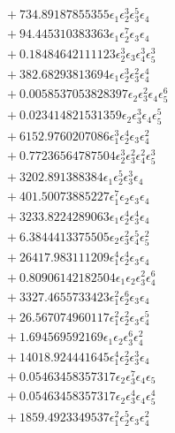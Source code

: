 \documentclass[10pt]{article}
\begin{document}
\begin{align*}
&{}  + 734.89187855355 \epsilon_{1} \epsilon_{2}^{3} \epsilon_{3}^{5} \epsilon_{4} \\
&{}  + 94.445310383363 \epsilon_{1} \epsilon_{2}^{7} \epsilon_{3} \epsilon_{4} \\
&{}  + 0.18484642111123 \epsilon_{2}^{3} \epsilon_{3} \epsilon_{4}^{3} \epsilon_{5}^{3} \\
&{}  + 382.68293813694 \epsilon_{1} \epsilon_{2}^{3} \epsilon_{3}^{2} \epsilon_{4}^{4} \\
&{}  + 0.0058537053828397 \epsilon_{2} \epsilon_{3}^{2} \epsilon_{4} \epsilon_{5}^{6} \\
&{}  + 0.023414821531359 \epsilon_{2} \epsilon_{3}^{3} \epsilon_{4} \epsilon_{5}^{5} \\
&{}  + 6152.9760207086 \epsilon_{1}^{3} \epsilon_{2}^{4} \epsilon_{3} \epsilon_{4}^{2} \\
&{}  + 0.77236564787504 \epsilon_{2}^{3} \epsilon_{3}^{2} \epsilon_{4}^{2} \epsilon_{5}^{3} \\
&{}  + 3202.891388384 \epsilon_{1} \epsilon_{2}^{5} \epsilon_{3}^{3} \epsilon_{4} \\
&{}  + 401.50073885227 \epsilon_{1}^{7} \epsilon_{2} \epsilon_{3} \epsilon_{4} \\
&{}  + 3233.8224289063 \epsilon_{1} \epsilon_{2}^{4} \epsilon_{3}^{4} \epsilon_{4} \\
&{}  + 6.3844413375505 \epsilon_{2} \epsilon_{3}^{2} \epsilon_{4}^{5} \epsilon_{5}^{2} \\
&{}  + 26417.983111209 \epsilon_{1}^{4} \epsilon_{2}^{4} \epsilon_{3} \epsilon_{4} \\
&{}  + 0.80906142182504 \epsilon_{1} \epsilon_{2} \epsilon_{3}^{2} \epsilon_{4}^{6} \\
&{}  + 3327.4655733423 \epsilon_{1}^{2} \epsilon_{2}^{6} \epsilon_{3} \epsilon_{4} \\
&{}  + 26.567074960117 \epsilon_{1}^{2} \epsilon_{2}^{2} \epsilon_{3} \epsilon_{4}^{5} \\
&{}  + 1.694569592169 \epsilon_{1} \epsilon_{2} \epsilon_{3}^{6} \epsilon_{4}^{2} \\
&{}  + 14018.924441645 \epsilon_{1}^{4} \epsilon_{2}^{2} \epsilon_{3}^{3} \epsilon_{4} \\
&{}  + 0.05463458357317 \epsilon_{2} \epsilon_{3}^{7} \epsilon_{4} \epsilon_{5} \\
&{}  + 0.05463458357317 \epsilon_{2} \epsilon_{3}^{4} \epsilon_{4} \epsilon_{5}^{4} \\
&{}  + 1859.4923349537 \epsilon_{1}^{2} \epsilon_{2}^{5} \epsilon_{3} \epsilon_{4}^{2} \\

\end{align*}
\end{document}
